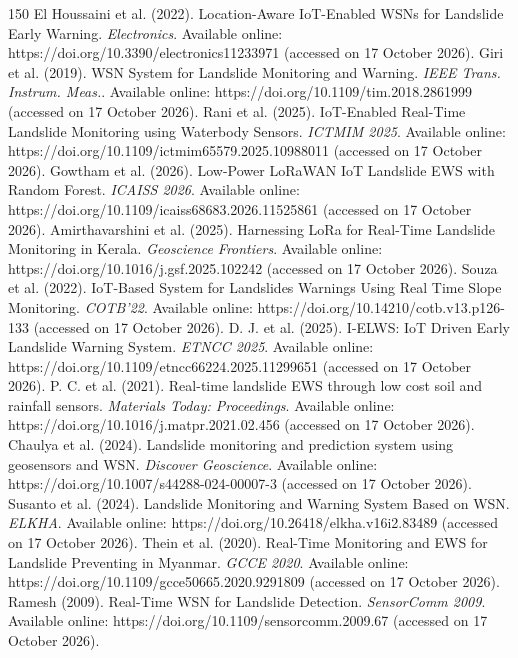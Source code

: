 \begin{thebibliography}{150}
El Houssaini et al. (2022). Location-Aware IoT-Enabled WSNs for Landslide Early Warning. \textit{Electronics}. Available online: https://doi.org/10.3390/electronics11233971 (accessed on 17 October 2026).
Giri et al. (2019). WSN System for Landslide Monitoring and Warning. \textit{IEEE Trans. Instrum. Meas.}. Available online: https://doi.org/10.1109/tim.2018.2861999 (accessed on 17 October 2026).
Rani et al. (2025). IoT-Enabled Real-Time Landslide Monitoring using Waterbody Sensors. \textit{ICTMIM 2025}. Available online: https://doi.org/10.1109/ictmim65579.2025.10988011 (accessed on 17 October 2026).
Gowtham et al. (2026). Low-Power LoRaWAN IoT Landslide EWS with Random Forest. \textit{ICAISS 2026}. Available online: https://doi.org/10.1109/icaiss68683.2026.11525861 (accessed on 17 October 2026).
Amirthavarshini et al. (2025). Harnessing LoRa for Real-Time Landslide Monitoring in Kerala. \textit{Geoscience Frontiers}. Available online: https://doi.org/10.1016/j.gsf.2025.102242 (accessed on 17 October 2026).
Souza et al. (2022). IoT-Based System for Landslides Warnings Using Real Time Slope Monitoring. \textit{COTB'22}. Available online: https://doi.org/10.14210/cotb.v13.p126-133 (accessed on 17 October 2026).
D. J. et al. (2025). I-ELWS: IoT Driven Early Landslide Warning System. \textit{ETNCC 2025}. Available online: https://doi.org/10.1109/etncc66224.2025.11299651 (accessed on 17 October 2026).
P. C. et al. (2021). Real-time landslide EWS through low cost soil and rainfall sensors. \textit{Materials Today: Proceedings}. Available online: https://doi.org/10.1016/j.matpr.2021.02.456 (accessed on 17 October 2026).
Chaulya et al. (2024). Landslide monitoring and prediction system using geosensors and WSN. \textit{Discover Geoscience}. Available online: https://doi.org/10.1007/s44288-024-00007-3 (accessed on 17 October 2026).
Susanto et al. (2024). Landslide Monitoring and Warning System Based on WSN. \textit{ELKHA}. Available online: https://doi.org/10.26418/elkha.v16i2.83489 (accessed on 17 October 2026).
Thein et al. (2020). Real-Time Monitoring and EWS for Landslide Preventing in Myanmar. \textit{GCCE 2020}. Available online: https://doi.org/10.1109/gcce50665.2020.9291809 (accessed on 17 October 2026).
Ramesh (2009). Real-Time WSN for Landslide Detection. \textit{SensorComm 2009}. Available online: https://doi.org/10.1109/sensorcomm.2009.67 (accessed on 17 October 2026).

\end{thebibliography}
